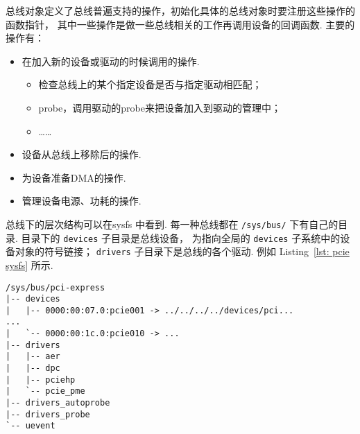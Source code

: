 总线对象定义了总线普遍支持的操作，初始化具体的总线对象时要注册这些操作的函数指针，
其中一些操作是做一些总线相关的工作再调用设备的回调函数.
主要的操作有：
\begin{itemize}
	\item 在加入新的设备或驱动的时候调用的操作.
	      \begin{itemize}
		      \item 检查总线上的某个指定设备是否与指定驱动相匹配；
		      \item probe，调用驱动的probe来把设备加入到驱动的管理中；
		      \item ……
	      \end{itemize}
	\item 设备从总线上移除后的操作.
	\item 为设备准备DMA的操作.
	\item 管理设备电源、功耗的操作.
\end{itemize}

总线下的层次结构可以在sysfs 中看到.
每一种总线都在 \lstinline{/sys/bus/} 下有自己的目录.
目录下的 \lstinline{devices} 子目录是总线设备，
为指向全局的 \lstinline{devices} 子系统中的设备对象的符号链接；
\lstinline{drivers} 子目录下是总线的各个驱动.
例如 Listing~\ref{lst: pcie sysfs} 所示.

\begin{lstlisting}[caption={PCIE总线在sysfs中的结构}, label={lst: pcie sysfs}]
/sys/bus/pci-express
|-- devices
|   |-- 0000:00:07.0:pcie001 -> ../../../../devices/pci...
...
|   `-- 0000:00:1c.0:pcie010 -> ...
|-- drivers
|   |-- aer
|   |-- dpc
|   |-- pciehp
|   `-- pcie_pme
|-- drivers_autoprobe
|-- drivers_probe
`-- uevent
\end{lstlisting}

